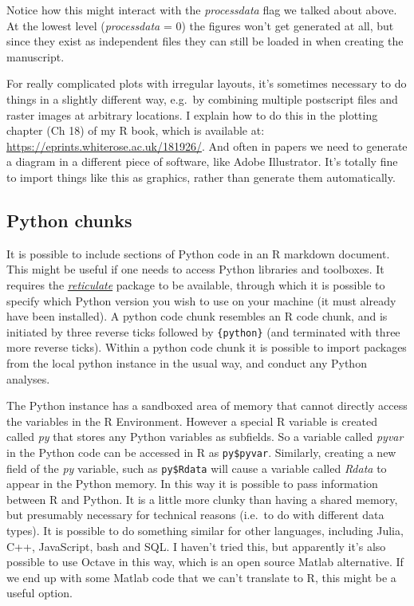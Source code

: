 \documentclass[
]{article}
\begin{document}
Notice how this might interact with the \emph{processdata} flag we talked about above. At the lowest level (\emph{processdata} = 0) the figures won't get generated at all, but since they exist as independent files they can still be loaded in when creating the manuscript.

For really complicated plots with irregular layouts, it's sometimes necessary to do things in a slightly different way, e.g.~by combining multiple postscript files and raster images at arbitrary locations. I explain how to do this in the plotting chapter (Ch 18) of my R book, which is available at: \url{https://eprints.whiterose.ac.uk/181926/}. And often in papers we need to generate a diagram in a different piece of software, like Adobe Illustrator. It's totally fine to import things like this as graphics, rather than generate them automatically.

\hypertarget{python-chunks}{%
\subsection{Python chunks}\label{python-chunks}}

It is possible to include sections of Python code in an R markdown document. This might be useful if one needs to access Python libraries and toolboxes. It requires the \href{https://CRAN.R-project.org/package=reticulate}{\emph{reticulate}} package to be available, through which it is possible to specify which Python version you wish to use on your machine (it must already have been installed). A python code chunk resembles an R code chunk, and is initiated by three reverse ticks followed by \texttt{\{python\}} (and terminated with three more reverse ticks). Within a python code chunk it is possible to import packages from the local python instance in the usual way, and conduct any Python analyses.

The Python instance has a sandboxed area of memory that cannot directly access the variables in the R Environment. However a special R variable is created called \emph{py} that stores any Python variables as subfields. So a variable called \emph{pyvar} in the Python code can be accessed in R as \texttt{py\$pyvar}. Similarly, creating a new field of the \emph{py} variable, such as \texttt{py\$Rdata} will cause a variable called \emph{Rdata} to appear in the Python memory. In this way it is possible to pass information between R and Python. It is a little more clunky than having a shared memory, but presumably necessary for technical reasons (i.e.~to do with different data types). It is possible to do something similar for other languages, including Julia, C++, JavaScript, bash and SQL. I haven't tried this, but apparently it's also possible to use Octave in this way, which is an open source Matlab alternative. If we end up with some Matlab code that we can't translate to R, this might be a useful option.
\end{document}
